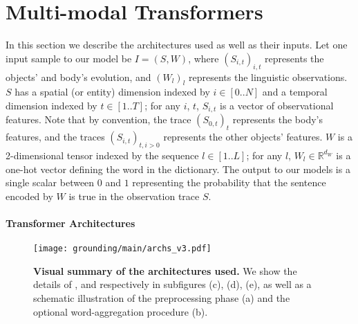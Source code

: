 \section{Multi-modal Transformers}

In this section we describe the architectures used as well as their inputs. Let one input sample to our model be $I = (S, W)$, where $(S_{i, t})_{i,t}$ represents the objects' and body's evolution, and $(W_l)_{l}$ represents the linguistic observations. $S$ has a spatial (or entity) dimension indexed by $i \in [0..N]$ and a temporal dimension indexed by $t \in [1..T]$; for any $i$, $t$, $S_{i, t}$ is a vector of observational features. Note that by convention, the trace $(S_{0, t})_{t}$ represents the body's features, and the traces $(S_{i, t})_{t, i > 0}$ represents the other objects' features. $W$ is a 2-dimensional tensor indexed by the sequence
$l \in [1..L]$; for any $l$, $W_l \in \mathbb{R}^{d_W}$ is a one-hot vector defining the word in the dictionary. The output to our models is a single scalar between $0$ and $1$ representing the probability that the sentence encoded by $W$ is true in the observation trace $S$. 
%
%
\paragraph{Transformer Architectures} 

\begin{figure}[h]
\centering
\texttt{[image: grounding/main/archs\_v3.pdf]}
\caption{\textbf{Visual summary of the architectures used.} We show the details of \utm, \stm and \ttm respectively in subfigures (c), (d), (e), as well as a schematic illustration of the preprocessing phase (a) and the optional word-aggregation procedure (b).}
\label{fig:archs}
\end{figure}

